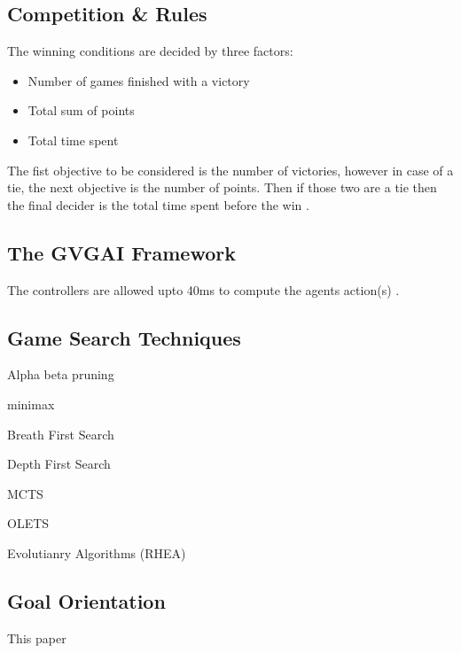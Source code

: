 \documentclass[journal]{IEEEtran}
\begin{document}
\subsection{Competition \& Rules}

The winning conditions are decided by three factors:
\begin{itemize}
    \item Number of games finished with a victory
    \item Total sum of points
    \item Total time spent
\end{itemize}
The fist objective to be considered is the number of victories, however in case of a tie, the next objective is the number of points. Then if those two are a tie then the final decider is the total time spent before the win \cite{perez20162014}.

\subsection{The GVGAI Framework}
The controllers are allowed upto 40ms to compute the agents action(s) \cite{perez2016GVGAICompetition, GVGAI}.






\subsection{Game Search Techniques}

Alpha beta pruning

minimax

Breath First Search

Depth First Search

MCTS

OLETS


Evolutianry Algorithms
(RHEA)











\subsection{Goal Orientation}
This paper 
\cite{ross2014general}
\end{document}
